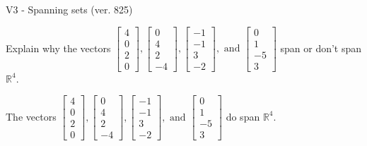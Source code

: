 \begin{exercise}
  \begin{exerciseTitle}V3 - Spanning sets (ver. 825)\end{exerciseTitle}
  \begin{exerciseStatement}
    Explain why the vectors \(\left[\begin{array}{r}
4 \\
0 \\
2 \\
0
\end{array}\right] , \left[\begin{array}{r}
0 \\
4 \\
2 \\
-4
\end{array}\right] , \left[\begin{array}{r}
-1 \\
-1 \\
3 \\
-2
\end{array}\right] , \text{ and } \left[\begin{array}{r}
0 \\
1 \\
-5 \\
3
\end{array}\right]\) span or don't span \(\mathbb{R}^4\). 
	


  \end{exerciseStatement}
  \begin{exerciseAnswer}
   The vectors \(\left[\begin{array}{r}
4 \\
0 \\
2 \\
0
\end{array}\right] , \left[\begin{array}{r}
0 \\
4 \\
2 \\
-4
\end{array}\right] , \left[\begin{array}{r}
-1 \\
-1 \\
3 \\
-2
\end{array}\right] , \text{ and } \left[\begin{array}{r}
0 \\
1 \\
-5 \\
3
\end{array}\right]\) 
  	 do  
	span \(\mathbb{R}^4\).
  


  \end{exerciseAnswer}
\end{exercise}